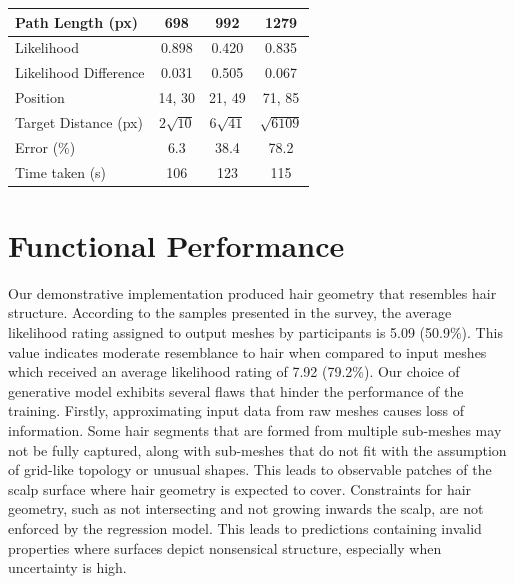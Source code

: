 \documentclass[ %
author={Dillon Keith Diep},
supervisor={Dr. Carl Henrik Ek},
degree={MEng},
title={ART-CG Hair:},
subtitle={Assisted Real-time Content Generation of Stylised Virtual Hair},
type={Research},
year={2017} ]{dissertation}
\begin{document}
\begin{table}[!h]
\begin{tabular}{|l|c|c|c|}
		\hline
		Path Length (px) & 698 & 992 & 1279\\
		\hline 
		Likelihood & 0.898 & 0.420 & 0.835\\
		\hline
		Likelihood Difference & 0.031 & 0.505 & 0.067\\
		\hline
		Position & 14, 30 & 21, 49 & 71, 85\\
		\hline
		Target Distance (px) & $2\sqrt{10}$ & $6\sqrt{41}$ & $\sqrt{6109}$\\
		\hline
		Error (\%) & 6.3 & 38.4 & 78.2\\
		\hline
		Time taken (s) & 106 & 123 & 115\\
		\hline
	\end{tabular}
	\label{nickresult}
\end{table}

\section{Functional Performance}
Our demonstrative implementation produced hair geometry that resembles hair structure. According to the samples presented in the survey, the average likelihood rating assigned to output meshes by participants is 5.09 (50.9\%). This value indicates moderate resemblance to hair when compared to input meshes which received an average likelihood rating of 7.92 (79.2\%). Our choice of generative model exhibits several flaws that hinder the performance of the training. Firstly, approximating input data from raw meshes causes loss of information. Some hair segments that are formed from multiple sub-meshes may not be fully captured, along with sub-meshes that do not fit with the assumption of grid-like topology or unusual shapes. This leads to observable patches of the scalp surface where hair geometry is expected to cover. Constraints for hair geometry, such as not intersecting and not growing inwards the scalp, are not enforced by the regression model. This leads to predictions containing invalid properties where surfaces depict nonsensical structure, especially when uncertainty is high.
\end{document}
